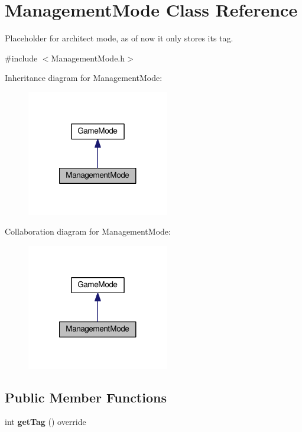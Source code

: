 \hypertarget{classManagementMode}{\section{Management\-Mode Class Reference}
\label{classManagementMode}
}


Placeholder for architect mode, as of now it only stores its tag.  




{\ttfamily \#include $<$Management\-Mode.\-h$>$}



Inheritance diagram for Management\-Mode\-:
\nopagebreak
\begin{figure}[H]
\begin{center}
\leavevmode
\includegraphics[width=176pt]{classManagementMode__inherit__graph}
\end{center}
\end{figure}


Collaboration diagram for Management\-Mode\-:
\nopagebreak
\begin{figure}[H]
\begin{center}
\leavevmode
\includegraphics[width=176pt]{classManagementMode__coll__graph}
\end{center}
\end{figure}
\subsection*{Public Member Functions}
\begin{DoxyCompactItemize}
\item 
\hypertarget{classManagementMode_aaaf37f899b6e2ca1aff8f02349877c94}{int {\bfseries get\-Tag} () override}\label{classManagementMode_aaaf37f899b6e2ca1aff8f02349877c94}

\end{DoxyCompactItemize}
